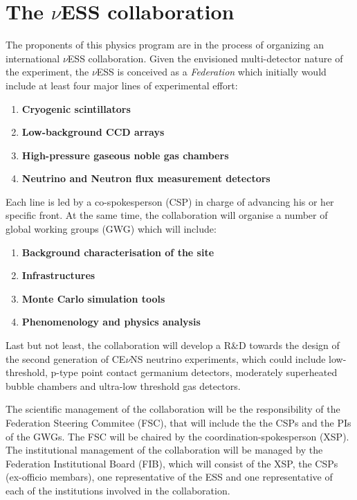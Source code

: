 \documentclass[12pt]{article}
\begin{document}
\section{The $\nu$ESS collaboration}
The proponents of this physics program are in the process of organizing an international $\nu$ESS collaboration. Given the envisioned multi-detector nature of the experiment, the $\nu$ESS is conceived as a {\em Federation} which initially would include at least four major lines of experimental effort:
\begin{enumerate}
    \item {\bf Cryogenic scintillators}
     \item {\bf Low-background CCD arrays}
      \item {\bf High-pressure gaseous noble gas chambers}
     \item {\bf Neutrino and Neutron flux measurement detectors}
\end{enumerate}

Each line is led by a co-spokesperson (CSP) in charge of advancing his or her specific front. At the same time, the collaboration will organise a number of global working groups (GWG) which will include:

\begin{enumerate}
    \item {\bf Background characterisation of the site}
     \item {\bf Infrastructures}
      \item {\bf Monte Carlo simulation tools}
     \item {\bf Phenomenology and physics analysis}
\end{enumerate}

Last but not least, the collaboration will develop a R\&D towards the design of the second generation of  CE$\nu$NS neutrino experiments, which could include low-threshold, p-type point contact germanium detectors, moderately  superheated  bubble  chambers and ultra-low threshold gas detectors. 

The scientific management of the collaboration will be the responsibility of the Federation Steering Commitee (FSC), that will include the the CSPs and the PIs of the GWGs. The FSC will be chaired by the coordination-spokesperson (XSP). The institutional management of the collaboration will be managed by the Federation Institutional Board (FIB), which will consist of the XSP, the CSPs (ex-officio membars), one representative of the ESS and one representative of each of the institutions involved in the collaboration.
\end{document}
